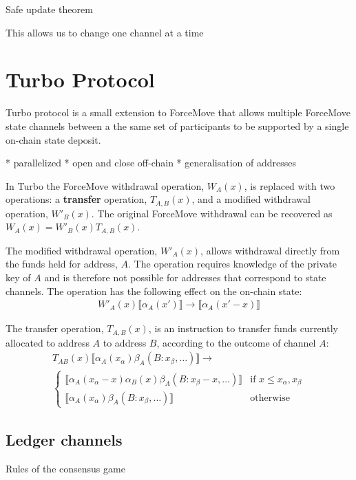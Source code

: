 \documentclass{article}
\theoremstyle{definition}
\newcommand{\adj}[1]{\llbracket #1 \rrbracket}
\begin{document}
Safe update theorem

This allows us to change one channel at a time


\section{Turbo Protocol}

Turbo protocol is a small extension to ForceMove that allows multiple ForceMove state
channels between a the same set of participants to be supported by a single on-chain
state deposit.

* parallelized
* open and close off-chain
* generalisation of addresses

In Turbo the ForceMove withdrawal operation, $W_A(x)$, is replaced with two operations: a
\textbf{transfer} operation, $T_{A,B}(x)$, and a modified withdrawal operation, $W'_B(x)$.
The original ForceMove withdrawal can be recovered as $W_A(x) = W'_B(x)T_{A,B}(x)$.

The modified withdrawal operation, $W'_A(x)$, allows withdrawal directly from the funds
held for address, $A$. The operation requires knowledge of the private key of $A$ and is
therefore not possible for addresses that correspond to state channels. The operation has
the following effect on the on-chain state:
\begin{align*}
W'_A(x) \adj{\alpha_A(x')} \rightarrow \adj{\alpha_A(x'-x)}
\end{align*}

The transfer operation, $T_{A,B}(x)$, is an instruction to transfer funds currently allocated
to address $A$ to address $B$, according to the outcome of channel $A$:
\begin{multline*}
T_{AB}(x) \adj{\alpha_A(x_\alpha)\beta_A(B:x_\beta, \dots)} \rightarrow \\
  \begin{cases}
      \adj{\alpha_A(x_\alpha - x)\alpha_B(x)\beta_A(B:x_\beta - x, \dots)} & 
      \text{if } x \leq x_\alpha, x_\beta \\
      \adj{\alpha_A(x_\alpha)\beta_A(B:x_\beta, \dots)} &
      \text{otherwise}
  \end{cases}
\end{multline*}

\subsection{Ledger channels}

Rules of the consensus game
\end{document}
